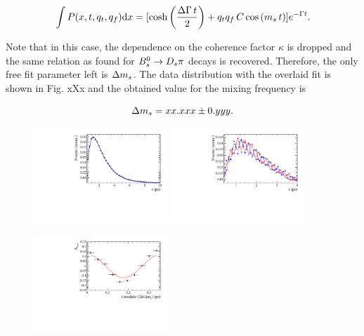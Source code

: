 \begin{equation}
\int P(x,t,q_t,q_f) \text d x = [\text{cosh} \left( \frac{\Delta \Gamma \, t}{2}\right) + q_t q_f \, C \, \text{cos} \left( m_s \, t \right)] e^{- \Gamma t}.
\end{equation}

Note that in this case, the dependence on the coherence factor $\kappa$ is dropped and the same relation as found for ${{B}^0_{s}}\rightarrow{\ensuremath{{D}_{s}}}{\ensuremath{\pi}}$ decays is recovered. 
Therefore, the only free fit parameter left is ${\Delta m_{{s}}}$. The data distribution with the overlaid fit is shown in Fig. xXx and the obtained value for the mixing frequency is

\begin{equation}
\label{eq:dms_from_Norm}
{\ensuremath{\Delta m_{{s}}}} = xx.xxx \pm 0.yyy.
\end{equation}

\begin{figure}[h]
	\centering
		\includegraphics[width=0.45\textwidth, height = !]{figs/timeFit/norm_taggingCalib/h_t.pdf} 
		\includegraphics[width=0.45\textwidth, height = !]{figs/timeFit/norm_taggingCalib/h_t_mixed.pdf} 

		\includegraphics[width=0.45\textwidth, height = !]{figs/timeFit/norm_taggingCalib/h_asym.pdf} 		
		\caption{} 		
\end{figure}	

